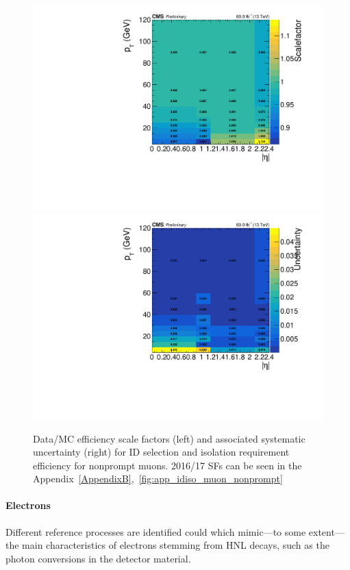 \begin{figure}[h]
  \centering
 \includegraphics[width=.48\textwidth]{Figures/c6/efficiencies/muons/2018/idiso_nonprompt_sf_2018.pdf}
\hfill{}
  \includegraphics[width=.48\textwidth]{Figures/c6/efficiencies/muons/2018/idiso_nonprompt_syst_2018.pdf}
  \caption{Data/MC efficiency scale factors (left) and associated
  systematic uncertainty (right) for ID selection and isolation
  requirement efficiency for nonprompt muons. 2016/17 SFs can be seen in the
  Appendix~\ref{AppendixB},~\ref{fig:app_idiso_muon_nonprompt}}
  \label{fig:idiso_muon_nonprompt}
\end{figure}

\paragraph{Electrons}\label{sec:eff_disp_ele}

Different reference processes are identified could which mimic---to
some extent---the main characteristics of \displ electrons 
stemming from HNL decays, such as the photon conversions in the
detector material.





